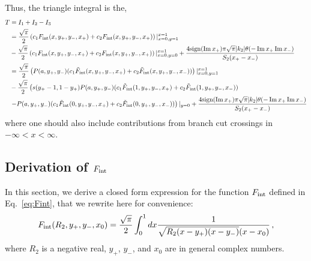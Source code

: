 \documentclass[twoside]{article}
\begin{document}
Thus, the triangle integral is the,
\begin{align}
T &=  I_1 + I_2 - I_3\\
&= \frac{\sqrt{\pi}}{2}\left( c_1F_{\rm int}(x,y_+,y_-, x_+) + c_2F_{\rm int}(x, y_+, y_-, x_+)\right)\vert^{x = 1}_{x = 0, y = 1}
\nonumber \\
&-\frac{\sqrt{\pi}}{2}\left( c_1F_{\rm int}(x, y_+, y_-, x_+) + c_2F_{\rm int}(x, y_+, y_-, x_+) \right)\vert^{x = 1}_{x = 0, y =
0} + \frac{4\textrm{sign}(\Im x_+)\pi\sqrt{\pi}|k_2|\theta(-\Im x_+ \Im x_-)}{S_2(x_+ - x_-)}\\
&= \frac{\sqrt{\pi}}{2}\left(P(a, y_+, y_-)(c_1\tilde{F}_{\rm int}(x, y_+, y_-, x_+) + c_2\tilde{F}_{\rm int}(x, y_+, y_-,
x_-))\right)\vert^{x = 1}_{x = 0, y = 1} \nonumber \\
&-\frac{\sqrt{\pi}}{2}\left( s(y_+ - 1, 1 - y_+)P(a, y_+, y_-)(c_1\tilde{F}_{\rm int}(1, y_+, y_-, x_+) + c_2\tilde{F}_{\rm int}(1, y_+,
y_-, x_-))\right.\nonumber \\
&\left.- P(a, y_+,y_-)(c_1\tilde{F}_{\rm int}(0, y_+, y_-, x_+) + c_2\tilde{F}_{\rm int}(0, y_+, y_-, x_-)) \right)\vert_{y = 0}+
\frac{4\textrm{sign}(\Im x_+)\pi\sqrt{\pi}|k_2|\theta(-\Im x_+ \Im x_-)}{S_2(x_+ - x_-)}
\end{align}
where one should also include contributions from branch cut crossings in $-\infty < x < \infty$.


\subsection{Derivation of $F_{\rm int}$}
\label{sec:Fint}

In this section, we derive a closed form expression for the function $F_{\rm int}$ defined in Eq.~\eqref{eq:Fint}, that we rewrite here for convenience:
\begin{equation}
F_{\rm int}(R_2, y_+, y_-, x_0) = \frac{\sqrt{\pi}}{2}\int_0^1 dx \frac{1}{\sqrt{R_2(x - y_+)(x - y_-)}(x-x_0)}\,,
\end{equation}
where $R_2$ is a negative real, $y_+$, $y_-$, and $x_0$ are in general complex numbers. 
\end{document}
